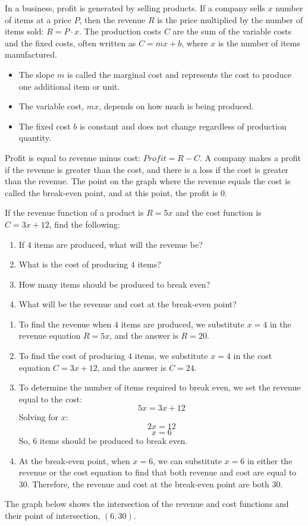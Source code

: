 In a business, profit is generated by selling products. If a company sells $x$ number of items at a price $P$, then the revenue $R$ is the price multiplied by the number of items sold: $R = P \cdot x$. The production costs $C$ are the sum of the variable costs and the fixed costs, often written as $C = mx + b$, where $x$ is the number of items manufactured.

\begin{itemize}
  \item The slope $m$ is called the marginal cost and represents the cost to produce one additional item or unit.
  \item The variable cost, $mx$, depends on how much is being produced.
  \item The fixed cost $b$ is constant and does not change regardless of production quantity.
\end{itemize}

Profit is equal to revenue minus cost: $Profit = R - C$. A company makes a profit if the revenue is greater than the cost, and there is a loss if the cost is greater than the revenue. The point on the graph where the revenue equals the cost is called the break-even point, and at this point, the profit is $0$.

\begin{example}
If the revenue function of a product is $R = 5x$ and the cost function is $C = 3x + 12$, find the following:
\begin{enumerate}
  \item If $4$ items are produced, what will the revenue be?
  \item What is the cost of producing $4$ items?
  \item How many items should be produced to break even?
  \item What will be the revenue and cost at the break-even point?
\end{enumerate}
\end{example}

\begin{solution}
\begin{enumerate}
  \item To find the revenue when $4$ items are produced, we substitute $x = 4$ in the revenue equation $R = 5x$, and the answer is $R = 20$.
  \item To find the cost of producing $4$ items, we substitute $x = 4$ in the cost equation $C = 3x + 12$, and the answer is $C = 24$.
  \item To determine the number of items required to break even, we set the revenue equal to the cost:
  \[5x = 3x + 12\]
  Solving for $x$:
  \[2x = 12\]
  \[x = 6\]
  So, $6$ items should be produced to break even.
  \item At the break-even point, when $x = 6$, we can substitute $x = 6$ in either the revenue or the cost equation to find that both revenue and cost are equal to $30$. Therefore, the revenue and cost at the break-even point are both $30$.
\end{enumerate}

The graph below shows the intersection of the revenue and cost functions and their point of intersection, $(6, 30)$.
\end{solution}

